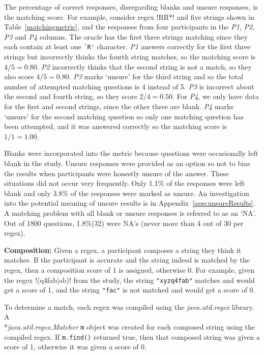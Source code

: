 The percentage of correct responses, disregarding blanks and unsure responses, is the matching score.
For example, consider regex \cverb!RR*! and five strings shown in Table~\ref{matchingmetric}, and the responses from four participants in the \emph{P1}, \emph{P2}, \emph{P3} and \emph{P4} columns.
The oracle has the first three strings matching since they each contain at least one \verb!`R'! character. \emph{P1} answers correctly for the first three strings but incorrectly thinks the fourth string matches, so the matching score is $4/5 = 0.80$. \emph{P2} incorrectly thinks that the second string is not a match, so they also score $4/5 = 0.80$.  \emph{P3} marks `unsure' for the third string and so the total number of attempted matching questions is 4 instead of 5. \emph{P3} is incorrect about the second and fourth string, so they score $2/4 = 0.50$.  For \emph{P4}, we only have data for the first and second strings, since the other three are blank.  \emph{P4} marks `unsure' for the second matching question so only one matching question has been attempted, and it was answered correctly so the matching score is $1/1 = 1.00$.

Blanks were incorporated into the metric because questions were occasionally left blank in the study. Unsure responses were provided as an option so not to bias the  results when participants were honestly unsure of the answer.  These situations did not occur very frequently. Only 1.1\% of the responses were left blank and only 3.8\% of the responses were marked as unsure.  An investigation into the potential meaning of unsure results is in Appendix~\ref{app:unsureResults}.  A matching problem with all blank or unsure responses is referred to as an `NA'. Out of 1800 questions, 1.8\%(32) were NA's (never more than 4 out of 30 per regex).

\textbf{Composition:}
Given a regex, a participant composes a string they think it matches. If the participant is accurate and the string indeed is matched by the regex, then a composition score of 1 is assigned, otherwise 0.  For example, given the regex \cverb!(q4fab|ab)! from the study, the string \verb!"xyzq4fab"! matches and would get a score of 1, and the string \verb!"fac"! is not matched and would get a score of 0.

To determine a match, each regex was compiled using the \emph{java.util.regex} library. A
\\*\emph{java.util.regex.Matcher} {\tt m} object was created for each composed string using the compiled regex.  If {\tt m.find()} returned true, then that composed string was given a score of 1, otherwise it was given a score of 0.

